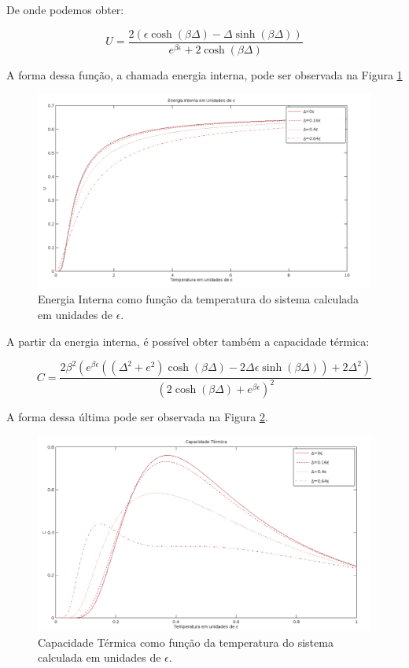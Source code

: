 De onde podemos obter:

\begin{equation}
U=\frac{2(\epsilon \cosh(\beta \Delta) - \Delta \sinh(\beta \Delta))}{e^{\beta \epsilon} + 2 \cosh(\beta \Delta)}
\end{equation}

A forma dessa função, a chamada energia interna, pode ser observada na Figura \ref{U}

\begin{figure}[!h]
\includegraphics[scale=.3]{U0a10}
\caption{Energia Interna como função da temperatura do sistema calculada em unidades de $\epsilon$.}
\label{U}
\end{figure}

A partir da energia interna, é possível obter também a capacidade térmica:

\begin{equation}
C=\frac{2 \beta^2 \left(e^{\beta \epsilon} \left(\left(\Delta^2+e^2\right) \cosh (\beta \Delta)-2 \Delta \epsilon \sinh (\beta \Delta)\right)+2 \Delta^2\right)}{\left(2 \cosh (\beta \Delta)+e^{\beta \epsilon}\right)^2}
\end{equation}

A forma dessa última pode ser observada na Figura \ref{C}.

\begin{figure}[!h]
\includegraphics[scale=.3]{Cpeq}
\caption{Capacidade Térmica como função da temperatura do sistema calculada em unidades de $\epsilon$.}
\label{C}
\end{figure}

